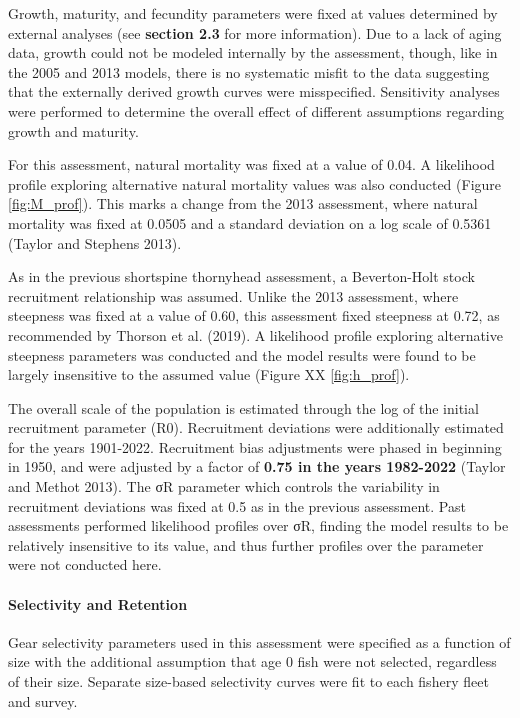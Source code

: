 \documentclass[11pt,
  english,
  letterpaper,
]{article}
\begin{document}
Growth, maturity, and fecundity parameters were fixed at values determined by external analyses (see \textbf{section 2.3} for more information). Due to a lack of aging data, growth could not be modeled internally by the assessment, though, like in the 2005 and 2013 models, there is no systematic misfit to the data suggesting that the externally derived growth curves were misspecified. Sensitivity analyses were performed to determine the overall effect of different assumptions regarding growth and maturity.

For this assessment, natural mortality was fixed at a value of 0.04. A likelihood profile exploring alternative natural mortality values was also conducted (Figure \ref{fig:M_prof}). This marks a change from the 2013 assessment, where natural mortality was fixed at 0.0505 and a standard deviation on a log scale of 0.5361 (Taylor and Stephens 2013).

As in the previous shortspine thornyhead assessment, a Beverton-Holt stock recruitment relationship was assumed. Unlike the 2013 assessment, where steepness was fixed at a value of 0.60, this assessment fixed steepness at 0.72, as recommended by Thorson et al. (2019). A likelihood profile exploring alternative steepness parameters was conducted and the model results were found to be largely insensitive to the assumed value (Figure XX \ref{fig:h_prof}).

The overall scale of the population is estimated through the log of the initial recruitment parameter (R0). Recruitment deviations were additionally estimated for the years 1901-2022. Recruitment bias adjustments were phased in beginning in 1950, and were adjusted by a factor of \textbf{0.75 in the years 1982-2022} (Taylor and Methot 2013). The σR parameter which controls the variability in recruitment deviations was fixed at 0.5 as in the previous assessment. Past assessments performed likelihood profiles over σR, finding the model results to be relatively insensitive to its value, and thus further profiles over the parameter were not conducted here.

\hypertarget{selectivity-and-retention}{%
\paragraph{Selectivity and Retention}\label{selectivity-and-retention}}

Gear selectivity parameters used in this assessment were specified as a function of size with the additional assumption that age 0 fish were not selected, regardless of their size. Separate size-based selectivity curves were fit to each fishery fleet and survey.
\end{document}

